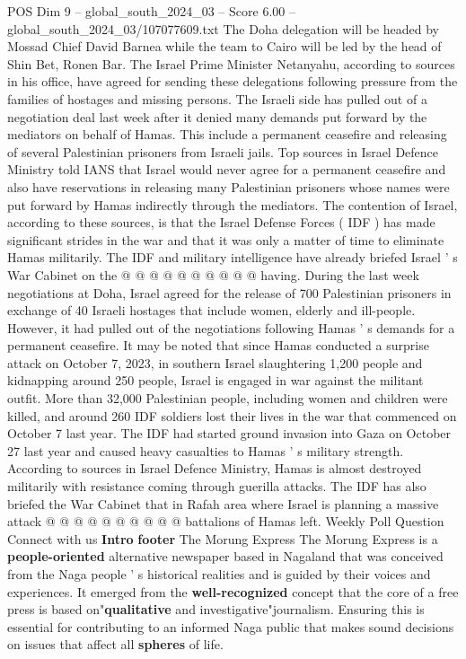 \begin{textsample}{POS Dim 9 – global\_south\_2024\_03 – Score 6.00 – global\_south\_2024\_03/107077609.txt}  \label{ex:f9_pos_043}
The Doha delegation will be headed by Mossad Chief David Barnea while the team to Cairo will be led by the head of Shin Bet, Ronen Bar.
The Israel Prime Minister Netanyahu, according to sources in his office, have agreed for sending these delegations following pressure from the families of hostages and missing persons.
The Israeli side has pulled out of a negotiation deal last week after it denied many demands put forward by the mediators on behalf of Hamas.
This include a permanent ceasefire and releasing of several Palestinian prisoners from Israeli jails.
Top sources in Israel Defence Ministry told IANS that Israel would never agree for a permanent ceasefire and also have reservations in releasing many Palestinian prisoners whose names were put forward by Hamas indirectly through the mediators.
The contention of Israel, according to these sources, is that the Israel Defense Forces ( IDF ) has made significant strides in the war and that it was only a matter of time to eliminate Hamas militarily.
The IDF and military intelligence have already briefed Israel ' s War Cabinet on the @ @ @ @ @ @ @ @ @ @ having.
During the last week negotiations at Doha, Israel agreed for the release of 700 Palestinian prisoners in exchange of 40 Israeli hostages that include women, elderly and ill-people.
However, it had pulled out of the negotiations following Hamas ' s demands for a permanent ceasefire.
It may be noted that since Hamas conducted a surprise attack on October 7, 2023, in southern Israel slaughtering 1,200 people and kidnapping around 250 people, Israel is engaged in war against the militant outfit.
More than 32,000 Palestinian people, including women and children were killed, and around 260 IDF soldiers lost their lives in the war that commenced on October 7 last year.
The IDF had started ground invasion into Gaza on October 27 last year and caused heavy casualties to Hamas ' s military strength.
According to sources in Israel Defence Ministry, Hamas is almost destroyed militarily with resistance coming through guerilla attacks.
The IDF has also briefed the War Cabinet that in Rafah area where Israel is planning a massive attack @ @ @ @ @ @ @ @ @ @ battalions of Hamas left.
Weekly Poll Question Connect with us \textbf{Intro} \textbf{footer} The Morung Express The Morung Express is a \textbf{people-oriented} alternative newspaper based in Nagaland that was conceived from the Naga people ' s historical realities and is guided by their voices and experiences.
It emerged from the \textbf{well-recognized} concept that the core of a free press is based on"\textbf{qualitative} and investigative"journalism.
Ensuring this is essential for contributing to an informed Naga public that makes sound decisions on issues that affect all \textbf{spheres} of life.

\end{textsample}
